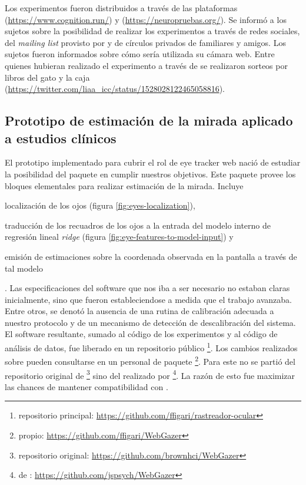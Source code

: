   Los experimentos fueron distribuidos a través de las plataformas \cognition
  (\url{https://www.cognition.run/}) y \neuropruebas
  (\url{https://neuropruebas.org/}).
  Se informó a los sujetos sobre la posibilidad de realizar los experimentos a
  través de redes sociales, del \textit{mailing list} provisto por \neuropruebas
  y de círculos privados de familiares y amigos.
  Los sujetos fueron informados sobre cómo sería utilizada su cámara web.
  Entre quienes hubieran realizado el experimento a través de \neuropruebas se 
  realizaron sorteos por libros del gato y la caja
  (\url{https://twitter.com/liaa_icc/status/1528028122465058816}).

\subsection{Prototipo de estimación de la mirada aplicado a estudios clínicos}

  El prototipo implementado para cubrir el rol de eye tracker web nació de
  estudiar la posibilidad del paquete \webgazer en cumplir nuestros objetivos.
  Este paquete provee los bloques elementales para realizar estimación de la
  mirada.
  Incluye \begin{enumerate*}
    \item localización de los ojos (figura \ref{fig:eyes-localization}),
    \item traducción de los recuadros de los ojos a la entrada del modelo interno
      de regresión lineal \textit{ridge} (figura
      \ref{fig:eye-features-to-model-input}) y
    \item emisión de estimaciones sobre la coordenada observada en la pantalla a
      través de tal modelo
  \end{enumerate*}.
  Las especificaciones del software que nos iba a ser necesario no estaban
  claras inicialmente, sino que fueron estableciendose a medida que el trabajo
  avanzaba.
  Entre otros, se denotó la ausencia de una rutina de calibración adecuada a
  nuestro protocolo y de un mecanismo de detección de descalibración del
  sistema.
  El software resultante, sumado al código de los experimentos y al código de
  análisis de datos, fue liberado en un repositorio público
  \footnote{repositorio principal:
  \url{https://github.com/ffigari/rastreador-ocular}}.
  Los cambios realizados sobre \webgazer pueden consultarse en un \fork
  personal de paquete \footnote{\fork propio:
  \url{https://github.com/ffigari/WebGazer}}.
  Para este \fork no se partió del repositorio original de \webgazer
  \footnote{repositorio original: \url{https://github.com/brownhci/WebGazer}}
  sino del \fork realizado por \jspsych \footnote{\fork de \jspsych:
  \url{https://github.com/jspsych/WebGazer}}.
  La razón de esto fue maximizar las chances de mantener compatibilidad con
  \jspsych.

